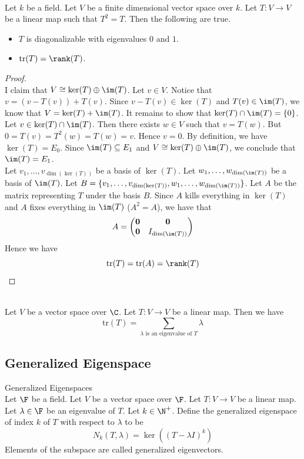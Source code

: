 \documentclass[a4paper]{article}
\begin{document}
\begin{eg}{}{}\\
Let $k$ be a field. Let $V$ be a finite dimensional vector space over $k$. Let $T:V\to V$ be a linear map such that $T^2=T$. Then the following are true. 
\begin{itemize}
\item $T$ is diagonalizable with eigenvalues $0$ and $1$. 
\item $\text{tr}(T)=\rank(T)$. 
\end{itemize}
\begin{proof}\\
I claim that $V\cong\ker(T)\oplus\im(T)$. Let $v\in V$. Notice that $v=(v-T(v))+T(v)$. Since $v-T(v)\in\ker(T)$ and $T(v)\in\im(T)$, we know that $V=\ker(T)+\im(T)$. It remains to show that $\ker(T)\cap\im(T)=\{0\}$. Let $v\in\ker(T)\cap\im(T)$. Then there exists $w\in V$ such that $v=T(w)$. But $0=T(v)=T^2(w)=T(w)=v$. Hence $v=0$. By definition, we have $\ker(T)=E_0$. Since $\im(T)\subseteq E_1$ and $V\cong\ker(T)\oplus\im(T)$, we conclude that $\im(T)=E_1$. \\

Let $v_1,\dots,v_{\dim(\ker(T))}$ be a basis of $\ker(T)$. Let $w_1,\dots,w_{\dim(\im(T))}$ be a basis of $\im(T)$. Let $B=\{v_1,\dots,v_{\dim(\ker(T))},w_1,\dots,w_{\dim(\im(T))}\}$. Let $A$ be the matrix representing $T$ under the basis $B$. Since $A$ kills everything in $\ker(T)$ and $A$ fixes everything in $\im(T)$ ($A^2=A$), we have that $$A=\begin{pmatrix}
\bold{0} & \bold{0}\\
\bold{0} & I_{\dim(\im(T))}
\end{pmatrix}$$ Hence we have $$\text{tr}(T)=\text{tr}(A)=\rank(T)$$
\end{proof}
\end{eg}

\begin{lmm}{}{}\\
Let $V$ be a vector space over $\C$. Let $T:V\to V$ be a linear map. Then we have $$\text{tr}(T)=\sum_{\lambda\text{ is an eigenvalue of }T}\lambda$$
\end{lmm}

\subsection{Generalized Eigenspace}
\begin{defn}{Generalized Eigenspaces}{}\\
Let $\F$ be a field. Let $V$ be a vector space over $\F$. Let $T:V\to V$ be a linear map. Let $\lambda\in\F$ be an eigenvalue of $T$. Let $k\in\N^+$. Define the generalized eigenspace of index $k$ of $T$ with respect to $\lambda$ to be $$N_k(T,\lambda)=\ker((T-\lambda I)^k)$$ Elements of the subspace are called generalized eigenvectors. 
\end{defn}
\end{document}
